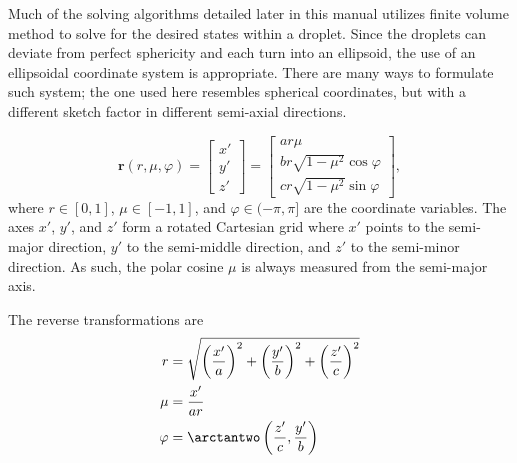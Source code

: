 Much of the solving algorithms detailed later in this manual utilizes finite volume method to solve for the desired states within a droplet. Since the droplets can deviate from perfect sphericity and each turn into
an ellipsoid, the use of an ellipsoidal coordinate system is appropriate. There are many ways to formulate such system; the one used here resembles spherical coordinates, but with a different sketch factor in different
semi-axial directions.

\begin{equation}
    \mathbf{r}(r, \mu, \varphi) =
    \begin{bmatrix}
        x' \\ y' \\ z'
    \end{bmatrix}
    = \begin{bmatrix}
        a r \mu\\
        b r \sqrt{1-\mu^2} \cos\varphi\\
        c r \sqrt{1-\mu^2} \sin\varphi
    \end{bmatrix},
\end{equation}
where $r \in [0, 1]$, $\mu \in [-1, 1]$, and $\varphi \in (-\pi, \pi]$ are the coordinate variables. The axes $x'$, $y'$, and $z'$ form a rotated Cartesian grid where $x'$ points to the
semi-major direction, $y'$ to the semi-middle direction, and $z'$ to the semi-minor direction. As such, the polar cosine $\mu$ is always measured from the semi-major axis.

The reverse transformations are
\begin{subequations}
    \begin{align}
        r &= \sqrt{\left( \frac{x'}{a} \right)^2 + \left( \frac{y'}{b} \right)^2 + \left( \frac{z'}{c} \right)^2 } \\
        \mu &= \frac{x'}{ar} \\
        \varphi &= \arctantwo\left( \frac{z'}{c}, \frac{y'}{b} \right)
    \end{align}
\end{subequations}

